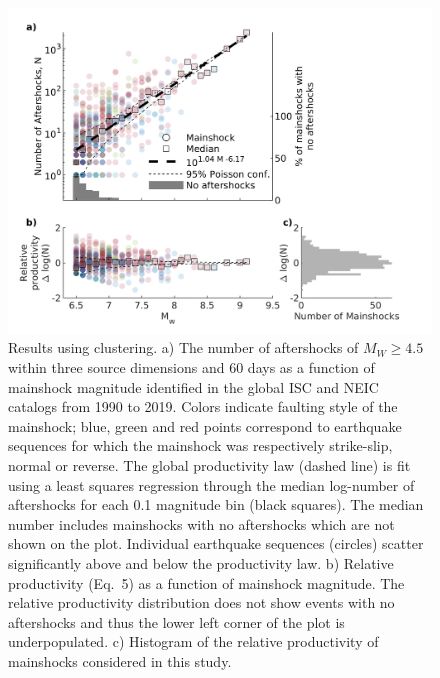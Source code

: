 \documentclass[draft]{agujournal}
\begin{document}
\begin{figure}[H]
    \centering
        \includegraphics{figures/prod_law_z2008.png}
    
    \caption{Results using \citet{Zaliapin2008} clustering. a) The number of aftershocks of $M_W\ge4.5$ within three source dimensions and 60 days as a function of mainshock magnitude identified in the global ISC and NEIC catalogs from 1990 to 2019. Colors indicate faulting style of the mainshock; blue, green and red points correspond to earthquake sequences for which the mainshock was respectively strike-slip, normal or reverse. The global productivity law (dashed line) is fit using a least squares regression through the median log-number of aftershocks for each 0.1 magnitude bin (black squares). The median number includes mainshocks with no aftershocks which are not shown on the plot. Individual earthquake sequences (circles) scatter significantly above and below the productivity law. b) Relative productivity (Eq.~5) as a function of mainshock magnitude. The relative productivity distribution does not show events with no aftershocks and thus the lower left corner of the plot is underpopulated. c) Histogram of the relative productivity of mainshocks considered in this study.
    }
    \label{fig:fms_prod2_z2008}
\end{figure}

\end{document}
